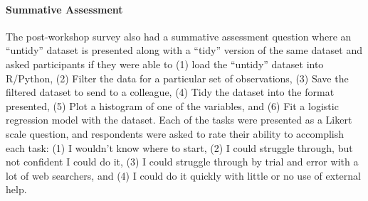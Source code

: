 \documentclass[030-workshop.tex]{subfiles}
\begin{document}
      \paragraph{Summative Assessment}

          The post-workshop survey also had a summative assessment question
          where an ``untidy'' dataset is presented along with a ``tidy'' version of the same dataset
          and asked participants if they were able to
          (1) load the ``untidy'' dataset into R/Python,
          (2) Filter the data for a particular set of observations,
          (3) Save the filtered dataset to send to a colleague,
          (4) Tidy the dataset into the format presented,
          (5) Plot a histogram of one of the variables, and
          (6) Fit a logistic regression model with the dataset.
          Each of the tasks were presented as a Likert scale question,
          and respondents were asked to rate their ability to accomplish each task:
          (1) I wouldn't know where to start,
          (2) I could struggle through, but not confident I could do it,
          (3) I could struggle through by trial and error with a lot of web searchers, and
          (4) I could do it quickly with little or no use of external help.




\end{document}
